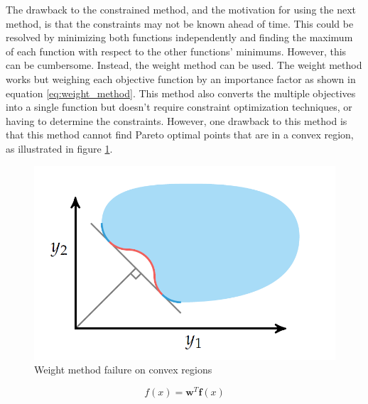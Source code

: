 The drawback to the constrained method, and the motivation for using the next method, is that the constraints may not be known ahead of time. This could be resolved by minimizing both functions independently and finding the maximum of each function with respect to the other functions' minimums. However, this can be cumbersome. Instead, the weight method can be used. The weight method works but weighing each objective function by an importance factor as shown in equation \ref{eq:weight_method}. This method also converts the multiple objectives into a single function but doesn't require constraint optimization techniques, or having to determine the constraints. However, one drawback to this method is that this method cannot find Pareto optimal points that are in a convex region, as illustrated in figure \ref{fig:weight_method_failure}.
\begin{figure}[t]
	\centering
	\includegraphics[width=0.65\linewidth]{figures/chapter_2/WeightMethodFailure.png}
	\caption{Weight method failure on convex regions}
	\label{fig:weight_method_failure}
\end{figure}
\begin{equation}
	f(x) = \mathbf w^T \mathbf f(x)
	\label{eq:weight_method}
\end{equation}


